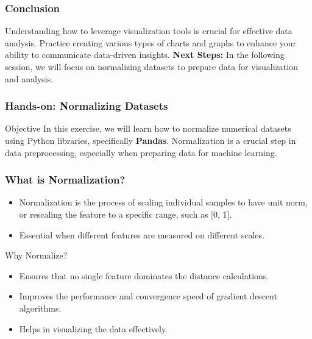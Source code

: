 \documentclass[aspectratio=169]{beamer}
\begin{document}
\begin{frame}[fragile]
    \frametitle{Conclusion}
    Understanding how to leverage visualization tools is crucial for effective data analysis. 
    Practice creating various types of charts and graphs to enhance your ability to communicate data-driven insights.
    \vspace{1em}
    \textbf{Next Steps:} In the following session, we will focus on normalizing datasets to prepare data for visualization and analysis.
\end{frame}

\begin{frame}[fragile]
    \frametitle{Hands-on: Normalizing Datasets}
    \begin{block}{Objective}
        In this exercise, we will learn how to normalize numerical datasets using Python libraries, specifically \textbf{Pandas}. Normalization is a crucial step in data preprocessing, especially when preparing data for machine learning.
    \end{block}
\end{frame}

\begin{frame}[fragile]
    \frametitle{What is Normalization?}
    \begin{itemize}
        \item Normalization is the process of scaling individual samples to have unit norm, or rescaling the feature to a specific range, such as [0, 1].
        \item Essential when different features are measured on different scales.
    \end{itemize}
    
    \begin{block}{Why Normalize?}
        \begin{itemize}
            \item Ensures that no single feature dominates the distance calculations.
            \item Improves the performance and convergence speed of gradient descent algorithms.
            \item Helps in visualizing the data effectively.
        \end{itemize}
    \end{block}
\end{frame}
\end{document}
